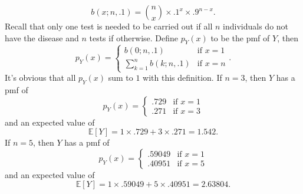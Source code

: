 \documentclass{exam}
\begin{document}
\[
	b(x; n, .1) = \binom nx \times .1^x \times .9^{n - x}.
\]
Recall that only one test is needed to be carried out if all $n$ individuals do not have the disease and $n$ tests if otherwise. Define $p_Y(x)$ to be the pmf of $Y$, then
\[
	p_Y(x) = \begin{cases}
		b(0; n, .1) & \text{if } x = 1 \\
		\displaystyle\sum_{k = 1}^n b(k; n, .1) & \text{if } x = n
	\end{cases}.
\]
It's obvious that all $p_Y(x)$ sum to $1$ with this definition. If $n = 3$, then $Y$ has a pmf of
\[
	p_Y(x) = \begin{cases}
		.729 & \text{if } x = 1 \\
		.271 & \text{if } x = 3
	\end{cases}
\]
and an expected value of
\[
	\mathbb E[Y] = 1 \times .729 + 3 \times .271 = 1.542.
\]
If $n = 5$, then $Y$ has a pmf of
\[
	p_Y(x) = \begin{cases}
		.59049 & \text{if } x = 1 \\
		.40951 & \text{if } x = 5
	\end{cases}
\]
and an expected value of
\[
	\mathbb E[Y] = 1 \times .59049 + 5 \times .40951 = 2.63804.
\]
\end{document}
